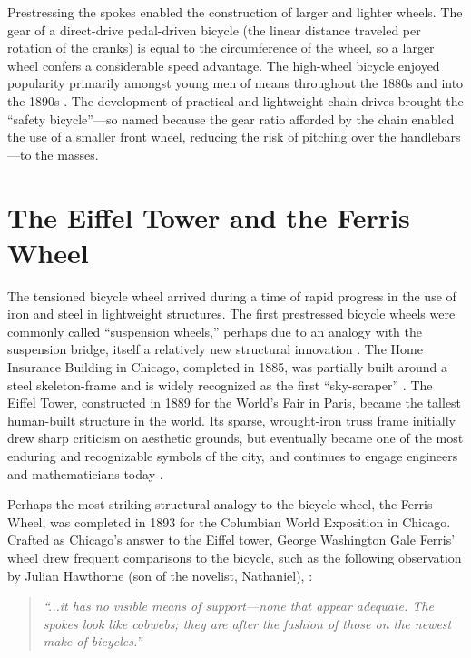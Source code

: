 \documentclass[../thesis.tex]{subfiles}
\begin{document}
Prestressing the spokes enabled the construction of larger and lighter wheels. The gear of a direct-drive pedal-driven bicycle (the linear distance traveled per rotation of the cranks) is equal to the circumference of the wheel, so a larger wheel confers a considerable speed advantage. The high-wheel bicycle enjoyed popularity primarily amongst young men of means throughout the 1880s and into the 1890s \cite{Smith1972}. The development of practical and lightweight chain drives brought the ``safety bicycle''---so named because the gear ratio afforded by the chain enabled the use of a smaller front wheel, reducing the risk of pitching over the handlebars---to the masses.

\section{The Eiffel Tower and the Ferris Wheel}

The tensioned bicycle wheel arrived during a time of rapid progress in the use of iron and steel in lightweight structures. The first prestressed bicycle wheels were commonly called ``suspension wheels,'' perhaps due to an analogy with the suspension bridge, itself a relatively new structural innovation \cite{Sewall1896}. The Home Insurance Building in Chicago, completed in 1885, was partially built around a steel skeleton-frame and is widely recognized as the first ``sky-scraper'' \cite{Miller1997}. The Eiffel Tower, constructed in 1889 for the World's Fair in Paris, became the tallest human-built structure in the world. Its sparse, wrought-iron truss frame initially drew sharp criticism on aesthetic grounds, but eventually became one of the most enduring and recognizable symbols of the city, and continues to engage engineers and mathematicians today \cite{Weidman2004}.

Perhaps the most striking structural analogy to the bicycle wheel, the Ferris Wheel, was completed in 1893 for the Columbian World Exposition in Chicago. Crafted as Chicago's answer to the Eiffel tower, George Washington Gale Ferris' wheel drew frequent comparisons to the bicycle, such as the following observation by Julian Hawthorne (son of the novelist, Nathaniel), \cite{Larson2004}:

\begin{quote}
\emph{``...it has no visible means of support---none that appear adequate. The spokes look like cobwebs; they are after the fashion of those on the newest make of bicycles.''}
\end{quote}
\end{document}
